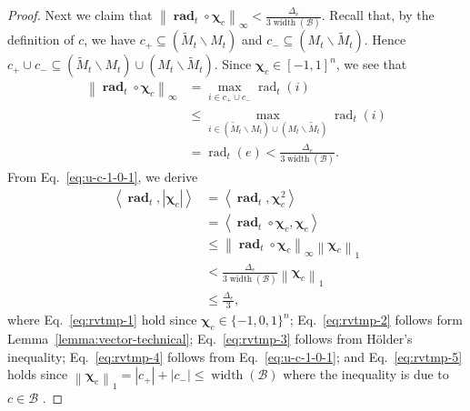 \documentclass{article}
\newcommand{\B}{\mathcal B}
\newcommand{\del}{\backslash}
\DeclareMathOperator{\rank}{width}
\DeclareMathOperator{\rad}{rad}
\newcommand{\inn}[1]{\left\langle #1 \right\rangle}
\newcommand{\nor}[1]{\left\|#1\right\|}
\renewcommand{\vec}[1]{\boldsymbol{#1}}
\renewcommand{\odot}{\circ}
\begin{document}
\begin{proof}
Next we claim that $\nor{\vec \rad_t \odot \vec \chi_c}_\infty < \frac{\Delta_e}{3\rank(\B)}$.
Recall that, by the definition of $c$, we have
$c_+\subseteq (\tilde M_t \del M_t)$ and $c_-\subseteq (M_t\del \tilde M_t)$. 
Hence $c_+\cup c_- \subseteq  (\tilde M_t \del M_t)\cup (M_t\del \tilde M_t)$.
Since $\vec \chi_c \in [-1,1]^n$, we see that 
\begin{align}
\nor{\vec \rad_t \odot \vec \chi_c}_\infty &= \max_{i\in  c_+\cup c_-} \rad_t(i) \nonumber \\
									    &\le \max_{i\in  (\tilde M_t \del M_t)\cup (M_t\del \tilde M_t)} \rad_t(i)  \nonumber \\
									    &= \rad_t(e) < \frac{\Delta_e}{3\rank(\B)} \label{eq:u-c-1-0-1}.
\end{align}
From Eq.~\eqref{eq:u-c-1-0-1}, we derive
\begin{align}
\inn{\vec \rad_t, |\vec \chi_c|} &= \inn{\vec\rad_t, \vec\chi_c^2} \label{eq:rvtmp-1}\\
																 &= \inn{\vec\rad_t \odot\vec\chi_c, \vec\chi_c} \label{eq:rvtmp-2}\\
																 &\le \nor{\vec\rad_t\odot \vec\chi_c}_\infty \nor{\vec\chi_c}_1 \label{eq:rvtmp-3}\\
																 &< \frac{\Delta_e}{3\rank(\B)}\nor{\vec\chi_c}_1 \label{eq:rvtmp-4}\\
																 &\le \frac{\Delta_e}{3}\label{eq:rvtmp-5},
\end{align}
where Eq.~\eqref{eq:rvtmp-1} hold since $\vec\chi_c \in \{-1,0,1\}^n$; 
Eq.~\eqref{eq:rvtmp-2} follows form Lemma~\ref{lemma:vector-technical};
Eq.~\eqref{eq:rvtmp-3} follows from H\"older's inequality;
Eq.~\eqref{eq:rvtmp-4} follows from Eq.~\eqref{eq:u-c-1-0-1};
and Eq.~\eqref{eq:rvtmp-5} holds since $\nor{\vec\chi_c}_1=|c_+|+|c_-| \le \rank(\B)$ where the inequality is due to $c\in \B$ .


\end{proof}
\end{document}
